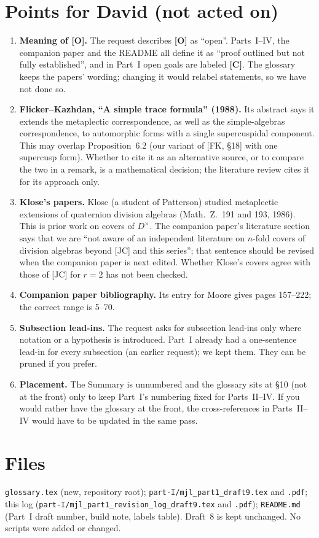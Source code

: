 \documentclass[11pt]{article}
\begin{document}
\section*{Points for David (not acted on)}
\begin{enumerate}[leftmargin=*]
\item \textbf{Meaning of [O].}  The request describes \textbf{[O]} as
``open''.  Parts~I--IV, the companion paper and the README all define
it as ``proof outlined but not fully established'', and in Part~I open
goals are labeled \textbf{[C]}.  The glossary keeps the papers' wording;
changing it would relabel statements, so we have not done so.
\item \textbf{Flicker--Kazhdan, ``A simple trace formula'' (1988).}
Its abstract says it extends the metaplectic correspondence, as well as
the simple-algebras correspondence, to automorphic forms with a single
supercuspidal component.  This may overlap Proposition~6.2 (our
variant of [FK, \S18] with one supercusp form).  Whether to cite it as
an alternative source, or to compare the two in a remark, is a
mathematical decision; the literature review cites it for its approach
only.
\item \textbf{Klose's papers.}  Klose (a student of Patterson) studied
metaplectic extensions of quaternion division algebras (Math.\ Z.\ 191
and 193, 1986).  This is prior work on covers of $D^\times$.  The
companion paper's literature section says that we are ``not aware of
an independent literature on $n$-fold covers of division algebras
beyond [JC] and this series''; that sentence should be revised when the
companion paper is next edited.  Whether Klose's covers agree with
those of [JC] for $r=2$ has not been checked.
\item \textbf{Companion paper bibliography.}  Its entry for Moore gives
pages 157--222; the correct range is 5--70.
\item \textbf{Subsection lead-ins.}  The request asks for subsection
lead-ins only where notation or a hypothesis is introduced.  Part~I
already had a one-sentence lead-in for every subsection (an earlier
request); we kept them.  They can be pruned if you prefer.
\item \textbf{Placement.}  The Summary is unnumbered and the glossary
sits at \S10 (not at the front) only to keep Part~I's numbering fixed
for Parts~II--IV.  If you would rather have the glossary at the front,
the cross-references in Parts~II--IV would have to be updated in the
same pass.
\end{enumerate}

\section*{Files}
\texttt{glossary.tex} (new, repository root);
\texttt{part-I/mjl\_part1\_draft9.tex} and \texttt{.pdf};
this log (\texttt{part-I/mjl\_part1\_revision\_log\_draft9.tex} and
\texttt{.pdf}); \texttt{README.md} (Part~I draft number, build note,
labels table).  Draft~8 is kept unchanged.  No scripts were added or
changed.
\end{document}
